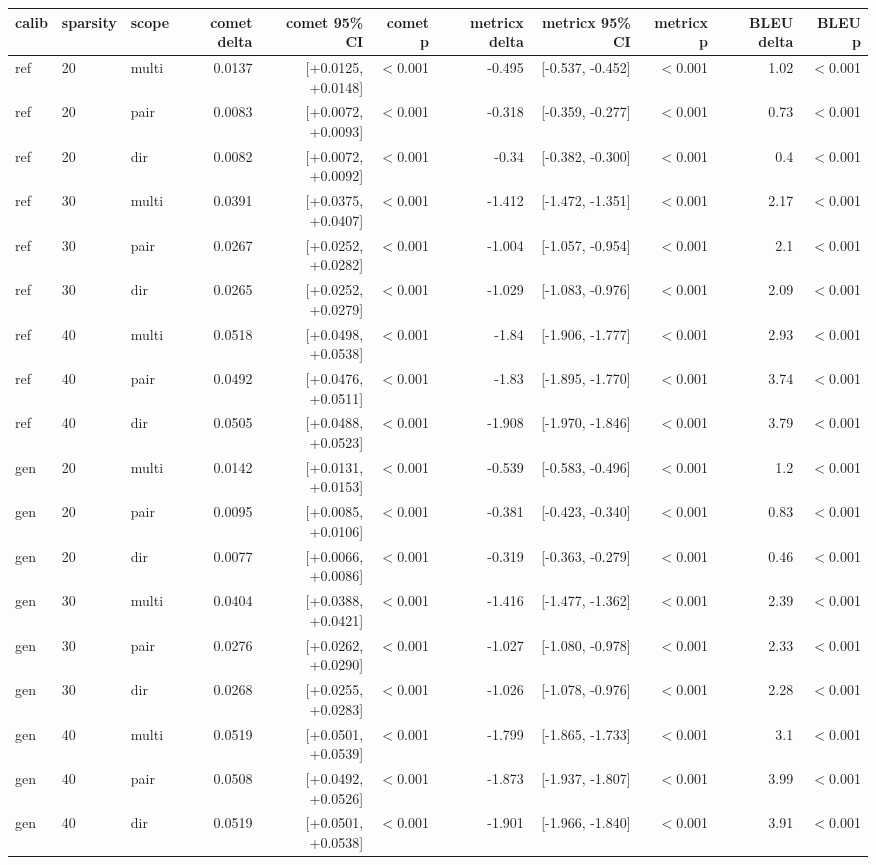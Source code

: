 \begin{tabular}{lllrrrrrrrr}
\toprule
calib & sparsity & scope & comet delta & comet 95\% CI & comet p & metricx delta & metricx 95\% CI & metricx p & BLEU delta & BLEU p \\
\midrule
ref & 20 & multi & 0.0137 & [+0.0125, +0.0148] & $<$0.001 & -0.495 & [-0.537, -0.452] & $<$0.001 & 1.02 & $<$0.001 \\
ref & 20 & pair & 0.0083 & [+0.0072, +0.0093] & $<$0.001 & -0.318 & [-0.359, -0.277] & $<$0.001 & 0.73 & $<$0.001 \\
ref & 20 & dir & 0.0082 & [+0.0072, +0.0092] & $<$0.001 & -0.34 & [-0.382, -0.300] & $<$0.001 & 0.4 & $<$0.001 \\
ref & 30 & multi & 0.0391 & [+0.0375, +0.0407] & $<$0.001 & -1.412 & [-1.472, -1.351] & $<$0.001 & 2.17 & $<$0.001 \\
ref & 30 & pair & 0.0267 & [+0.0252, +0.0282] & $<$0.001 & -1.004 & [-1.057, -0.954] & $<$0.001 & 2.1 & $<$0.001 \\
ref & 30 & dir & 0.0265 & [+0.0252, +0.0279] & $<$0.001 & -1.029 & [-1.083, -0.976] & $<$0.001 & 2.09 & $<$0.001 \\
ref & 40 & multi & 0.0518 & [+0.0498, +0.0538] & $<$0.001 & -1.84 & [-1.906, -1.777] & $<$0.001 & 2.93 & $<$0.001 \\
ref & 40 & pair & 0.0492 & [+0.0476, +0.0511] & $<$0.001 & -1.83 & [-1.895, -1.770] & $<$0.001 & 3.74 & $<$0.001 \\
ref & 40 & dir & 0.0505 & [+0.0488, +0.0523] & $<$0.001 & -1.908 & [-1.970, -1.846] & $<$0.001 & 3.79 & $<$0.001 \\
gen & 20 & multi & 0.0142 & [+0.0131, +0.0153] & $<$0.001 & -0.539 & [-0.583, -0.496] & $<$0.001 & 1.2 & $<$0.001 \\
gen & 20 & pair & 0.0095 & [+0.0085, +0.0106] & $<$0.001 & -0.381 & [-0.423, -0.340] & $<$0.001 & 0.83 & $<$0.001 \\
gen & 20 & dir & 0.0077 & [+0.0066, +0.0086] & $<$0.001 & -0.319 & [-0.363, -0.279] & $<$0.001 & 0.46 & $<$0.001 \\
gen & 30 & multi & 0.0404 & [+0.0388, +0.0421] & $<$0.001 & -1.416 & [-1.477, -1.362] & $<$0.001 & 2.39 & $<$0.001 \\
gen & 30 & pair & 0.0276 & [+0.0262, +0.0290] & $<$0.001 & -1.027 & [-1.080, -0.978] & $<$0.001 & 2.33 & $<$0.001 \\
gen & 30 & dir & 0.0268 & [+0.0255, +0.0283] & $<$0.001 & -1.026 & [-1.078, -0.976] & $<$0.001 & 2.28 & $<$0.001 \\
gen & 40 & multi & 0.0519 & [+0.0501, +0.0539] & $<$0.001 & -1.799 & [-1.865, -1.733] & $<$0.001 & 3.1 & $<$0.001 \\
gen & 40 & pair & 0.0508 & [+0.0492, +0.0526] & $<$0.001 & -1.873 & [-1.937, -1.807] & $<$0.001 & 3.99 & $<$0.001 \\
gen & 40 & dir & 0.0519 & [+0.0501, +0.0538] & $<$0.001 & -1.901 & [-1.966, -1.840] & $<$0.001 & 3.91 & $<$0.001 \\
\bottomrule
\end{tabular}
